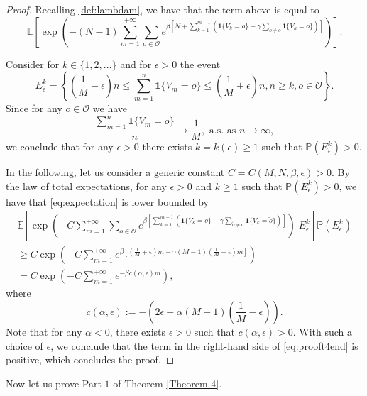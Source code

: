 \documentclass[11pt]{article}
\theoremstyle{definition}
\newcommand{\opn}{\mathcal{O}}
\def\P{{\mathbb P}}
\begin{document}
\begin{proof}
Recalling \eqref{def:lambdam}, we have that the term above is equal to
\begin{equation} \label{eq:expectation}
\mathbb{E}\left[\exp\left(-(N-1)\sum_{m=1}^{+\infty}\sum_{o\in \opn}e^{\beta [N+\sum_{k=1}^{m-1}(\mathbf{1}\{V_k=o\}-\gamma\sum_{\tilde{o}\neq o}\mathbf{1}\{V_k= \tilde{o}\})]} \right)\right].
\end{equation}

Consider for $k\in \{1,2,\ldots\}$  and for $\epsilon>0$ the event
$$
E_{\epsilon}^{k}=\left\{\left(\frac{1}{M}-\epsilon\right)n \leq \sum_{m=1}^{n}\mathbf{1}\{V_m=o\}\leq \left(\frac{1}{M}+\epsilon\right)n, n\geq k, o\in \opn\right\}.
$$
Since for any $o\in \opn$ we have
$$
\frac{\sum_{m=1}^{n}\mathbf{1}\{V_m=o\}}{n}\to \frac{1}{M}, \text{ a.s. as } n\to \infty,
$$
we conclude that for any $\epsilon>0$ there exists $k=k(\epsilon)\geq 1$ such that
$
\P(E_{\epsilon}^{k})>0.
$

In the following, let us consider a generic constant $C=C(M,N,\beta,\epsilon)>0$.
By the law of total expectations, for any $\epsilon>0$ and $k\geq 1$ such that $\P(E_{\epsilon}^{k})>0$, we have that \eqref{eq:expectation} is lower bounded by
\begin{multline}
\mathbb{E}\left[\exp\left(-C\sum_{m=1}^{+\infty}\sum_{o\in \opn}e^{\beta [\sum_{k=1}^{m-1}(\mathbf{1}\{V_k=o\}-\gamma\sum_{\tilde{o}\neq o}\mathbf{1}\{V_k= \tilde{o}\})]} \right)\Big|E_{\epsilon}^{k}\right]\P(E_{\epsilon}^{k})  \\
\label{eq:prooft4end}
\geq C\exp\left(-C\sum_{m=1}^{+\infty}e^{\beta [(\frac{1}{M}+\epsilon)m-\gamma(M-1)(\frac{1}{M}-\epsilon)m]} \right) \\ = C\exp\left(-C\sum_{m=1}^{+\infty}e^{-\beta c(\alpha,\epsilon)m} \right),
\end{multline}
where
$$
c(\alpha,\epsilon):=-\left(2\epsilon +\alpha(M-1)(\frac{1}{M}-\epsilon)\right).
$$
Note that for any $\alpha<0$, there exists $\epsilon>0$ such that $c(\alpha,\epsilon)>0$.
With such a choice of $\epsilon$, we conclude that
the term in the right-hand side of \eqref{eq:prooft4end} is positive,
which concludes the proof.
\end{proof}

Now let us prove Part $1$ of Theorem \ref{Theorem 4}.
\end{document}
